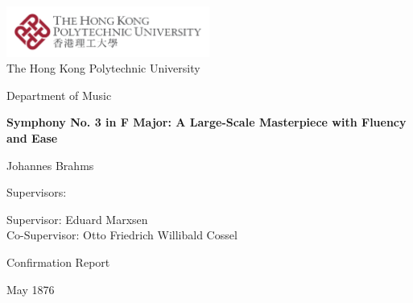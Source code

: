 \thispagestyle{empty}

\begin{center}

\vspace*{1cm}
\includegraphics[width=0.5\textwidth]{logo-name.pdf} \\

\vspace{2.5cm}
{\Large The Hong Kong Polytechnic University}

\vspace{0.5cm}
{\large Department of Music}

\vspace{2cm}
{\Large \textbf{
Symphony No. 3 in F Major: A Large-Scale Masterpiece with Fluency and Ease
}}

\vspace{2cm}
{\large Johannes Brahms}

\vspace{2cm}
{\large Supervisors:}

\vspace{0.5cm}
{\large Supervisor: Eduard Marxsen} \\
{\large Co-Supervisor: Otto Friedrich Willibald Cossel}

\vspace{2cm}
{\large Confirmation Report}

\vspace{0.5cm}
{\large May 1876}

\end{center}